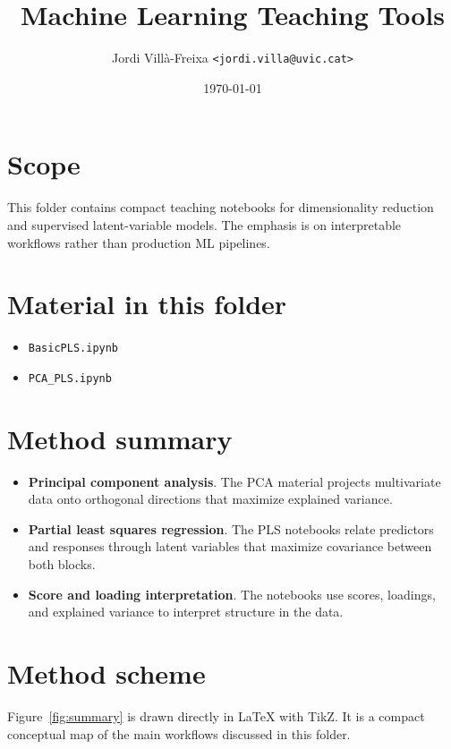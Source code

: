 \documentclass[11pt,a4paper]{article}
\title{Machine Learning Teaching Tools}
\author{Jordi Vill\`a-Freixa \texttt{<jordi.villa@uvic.cat>}}
\date{\today}
\begin{document}
    \maketitle

    \section*{Scope}
    This folder contains compact teaching notebooks for dimensionality reduction and supervised latent-variable models. The emphasis is on interpretable workflows rather than production ML pipelines.

    \section*{Material in this folder}
    \begin{itemize}[leftmargin=*]
\item \texttt{BasicPLS.ipynb}
\item \texttt{PCA\_PLS.ipynb}
    \end{itemize}

    \section*{Method summary}
    \begin{itemize}[leftmargin=*]
\item \textbf{Principal component analysis}. The PCA material projects multivariate data onto orthogonal directions that maximize explained variance.
\item \textbf{Partial least squares regression}. The PLS notebooks relate predictors and responses through latent variables that maximize covariance between both blocks.
\item \textbf{Score and loading interpretation}. The notebooks use scores, loadings, and explained variance to interpret structure in the data.
    \end{itemize}

    \section*{Method scheme}
    Figure~\ref{fig:summary} is drawn directly in LaTeX with TikZ. It is a compact conceptual map of the main workflows discussed in this folder.
\end{document}
